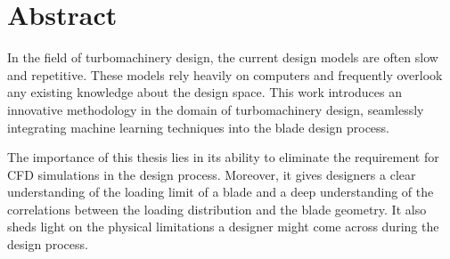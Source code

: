 \documentclass{config/polimiThesis}
\begin{document}
\chapter*{Abstract} 
In the field of turbomachinery design, the current design models are often slow and repetitive. These models rely heavily on computers and frequently overlook any existing knowledge about the design space. This work introduces an innovative methodology in the domain of turbomachinery design, seamlessly integrating machine learning techniques into the blade design process.

The importance of this thesis lies in its ability to eliminate the requirement for CFD simulations in the design process. Moreover, it gives designers a clear understanding of the loading limit of a blade and a deep understanding of the correlations between the loading distribution and the blade geometry. It also sheds light on the physical limitations a designer might come across during the design process.

\end{document}
